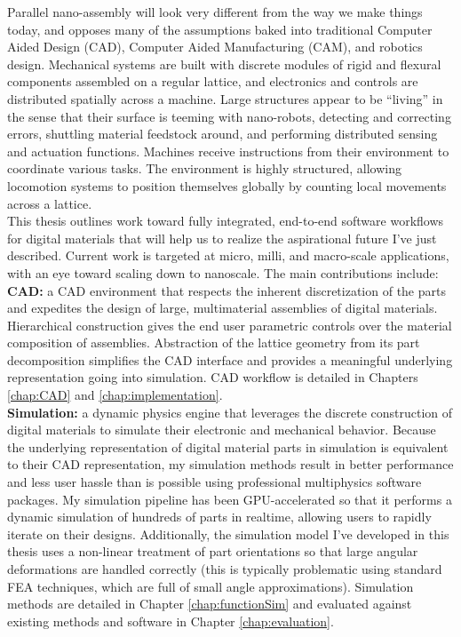 {Parallel nano-assembly will look very different from the way we make things today, and opposes many of the assumptions baked into traditional Computer Aided Design (CAD),  Computer Aided Manufacturing (CAM), and robotics design.  Mechanical systems are built with discrete modules of rigid and flexural components assembled on a regular lattice, and electronics and controls are distributed spatially across a machine.  Large structures appear to be ``living'' in the sense that their surface is teeming with nano-robots, detecting and correcting errors, shuttling material feedstock around, and performing distributed sensing and actuation functions.  Machines receive instructions from their environment to coordinate various tasks.  The environment is highly structured, allowing locomotion systems to position themselves globally by counting local movements across a lattice.  %
\\

This thesis outlines work toward fully integrated, end-to-end software workflows for digital materials that will help us to realize the aspirational future I've just described.  Current work is targeted at micro, milli, and macro-scale applications, with an eye toward scaling down to nanoscale.  The main contributions include:\\

\textbf{CAD:} a CAD environment that respects the inherent discretization of the parts and expedites the design of large, multimaterial assemblies of digital materials.  Hierarchical construction gives the end user parametric controls over the material composition of assemblies.   Abstraction of the lattice geometry from its part decomposition simplifies the CAD interface and provides a meaningful underlying representation going into simulation.  CAD workflow is detailed in Chapters \ref{chap:CAD} and \ref{chap:implementation}.\\

\textbf{Simulation:} a dynamic physics engine that leverages the discrete construction of digital materials to simulate their electronic and mechanical behavior.  Because the underlying representation of digital material parts in simulation is equivalent to their CAD representation, my simulation methods result in better performance and less user hassle than is possible using professional multiphysics software packages.  My simulation pipeline has been GPU-accelerated so that it performs a dynamic simulation of hundreds of parts in realtime, allowing users to rapidly iterate on their designs.  Additionally, the simulation model I've developed in this thesis uses a non-linear treatment of part orientations so that large angular deformations are handled correctly (this is typically problematic using standard FEA techniques, which are full of small angle approximations).  Simulation methods are detailed in Chapter \ref{chap:functionSim} and evaluated against existing methods and software in Chapter \ref{chap:evaluation}.\\

}
